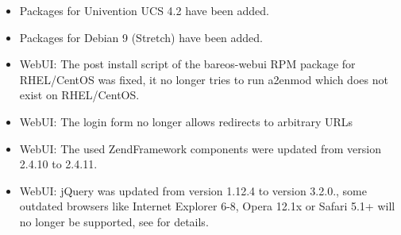 {\begin{itemize}
\begin{itemize}
\begin{itemize}
            \item Run following command to create the partial index:\\
                \path@su - postgres -c 'echo "CREATE INDEX file_jfnidpart_idx ON File(JobId, FilenameId) WHERE FileIndex = 0; ANALYZE File;" | psql bareos'@

        \end{itemize}
        \item \mysql
        \begin{itemize}
            \item When using MySQL or MariaDB, creating the following index improves the performance:\\

            \item Run following command to create the index:\\
                \path@echo "CREATE INDEX PathId_JobId_FileIndex_FileNameId ON File(PathId,JobId,FileIndex,FilenameId);" | mysql -u root bareos@

            \item  However, with larger amounts of directories and/or involved jobs, even with this index
                the performance of  may still be insufficient. We are working on optimizing
                the SQL query for MySQL/MariaDB to solve this problem.
        \end{itemize}
    \end{itemize}

  \item Packages for Univention UCS 4.2 have been added.
  \item Packages for Debian 9 (Stretch) have been added.
  \item WebUI: The post install script of the bareos-webui RPM package for RHEL/CentOS was fixed, it no longer tries to run a2enmod which does not exist on RHEL/CentOS.
  \item WebUI: The login form no longer allows redirects to arbitrary URLs
  \item WebUI: The used ZendFramework components were updated from version 2.4.10 to 2.4.11.
  \item WebUI: jQuery was updated from version 1.12.4 to version 3.2.0., some outdated browsers like Internet Explorer 6-8, Opera 12.1x or Safari 5.1+ will no longer be supported, see  for details.
\end{itemize}

}

